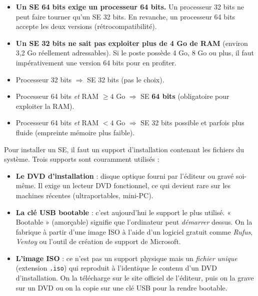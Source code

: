 \documentclass[11pt]{article}
\newcommand{\cle}[1]{{\popxbold\color{popdark}#1}}
\newcounter{popsec}
\newcounter{popsub}
\newcommand{\courssub}[1]{%
  \stepcounter{popsub}%
  \par\vspace{9pt}\noindent{\popxbold\fontsize{11.5}{13}\selectfont\color{popink}{\color{poporange}\thepopsec.\thepopsub}\hspace{6pt}#1}\par\nopagebreak\vspace{4pt}
}
\begin{document}
\begin{itemize}
\item \textbf{Un SE 64 bits exige un processeur 64 bits.} Un processeur 32 bits ne peut faire tourner qu'un SE 32 bits. En revanche, un processeur 64 bits accepte les deux versions (rétrocompatibilité).
\item \textbf{Un SE 32 bits ne sait pas exploiter plus de 4 Go de RAM} (environ 3,2 Go réellement adressables). Si le poste possède 4 Go, 8 Go ou plus, il faut impérativement une version 64 bits pour en profiter.
\end{itemize}

\begin{aretenir}
\begin{itemize}
\item Processeur 32 bits $\Rightarrow$ SE 32 bits (pas le choix).
\item Processeur 64 bits \emph{et} RAM $\geq 4$ Go $\Rightarrow$ SE \textbf{64 bits} (obligatoire pour exploiter la RAM).
\item Processeur 64 bits \emph{et} RAM $< 4$ Go $\Rightarrow$ SE 32 bits possible et parfois plus fluide (empreinte mémoire plus faible).
\end{itemize}
\end{aretenir}

\courssub{Les supports d'installation}

Pour installer un SE, il faut un \cle{support d'installation} contenant les fichiers du système. Trois supports sont couramment utilisés :

\begin{itemize}
\item \textbf{Le DVD d'installation} : disque optique fourni par l'éditeur ou gravé soi-même. Il exige un lecteur DVD fonctionnel, ce qui devient rare sur les machines récentes (ultraportables, mini-PC).
\item \textbf{La clé USB bootable} : c'est aujourd'hui le support le plus utilisé. « \cle{Bootable} » (amorçable) signifie que l'ordinateur peut \emph{démarrer} dessus. On la fabrique à partir d'une image ISO à l'aide d'un logiciel gratuit comme \emph{Rufus}, \emph{Ventoy} ou l'outil de création de support de Microsoft.
\item \textbf{L'image ISO} : ce n'est pas un support physique mais un \emph{fichier unique} (extension \texttt{.iso}) qui reproduit à l'identique le contenu d'un DVD d'installation. On la télécharge sur le site officiel de l'éditeur, puis on la grave sur un DVD ou on la copie sur une clé USB pour la rendre bootable.
\end{itemize}
\end{document}

